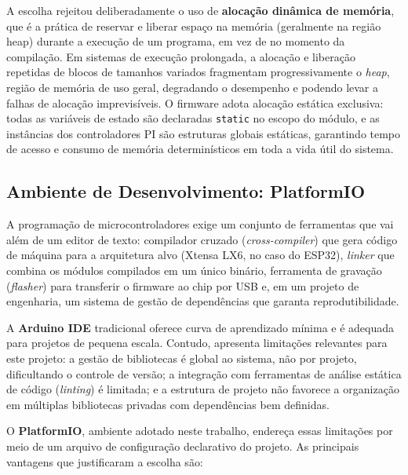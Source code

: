 A escolha rejeitou deliberadamente o uso de \textbf{alocação dinâmica de memória}, que é a prática de reservar e liberar espaço na memória (geralmente na região heap) durante a execução de um programa, em vez de no momento da compilação. Em sistemas de execução prolongada, a alocação e liberação repetidas de blocos de tamanhos variados fragmentam progressivamente o \textit{heap}, região de memória de uso geral, degradando o desempenho e podendo levar a falhas de alocação imprevisíveis. O firmware adota alocação estática exclusiva: todas as variáveis de estado são declaradas \texttt{static} no escopo do módulo, e as instâncias dos controladores PI são estruturas globais estáticas, garantindo tempo de acesso e consumo de memória determinísticos em toda a vida útil do sistema.

\subsection{Ambiente de Desenvolvimento: PlatformIO}

A programação de microcontroladores exige um conjunto de ferramentas que vai além de um editor de texto: compilador cruzado (\textit{cross-compiler}) que gera código de máquina para a arquitetura alvo (Xtensa LX6, no caso do ESP32), \textit{linker} que combina os módulos compilados em um único binário, ferramenta de gravação (\textit{flasher}) para transferir o firmware ao chip por USB e, em um projeto de engenharia, um sistema de gestão de dependências que garanta reprodutibilidade.

A \textbf{Arduino IDE} tradicional oferece curva de aprendizado mínima e é adequada para projetos de pequena escala. Contudo, apresenta limitações relevantes para este projeto: a gestão de bibliotecas é global ao sistema, não por projeto, dificultando o controle de versão; a integração com ferramentas de análise estática de código (\textit{linting}) é limitada; e a estrutura de projeto não favorece a organização em múltiplas bibliotecas privadas com dependências bem definidas.

O \textbf{PlatformIO}, ambiente adotado neste trabalho, endereça essas limitações por meio de um arquivo de configuração declarativo do projeto. As principais vantagens que justificaram a escolha são:

